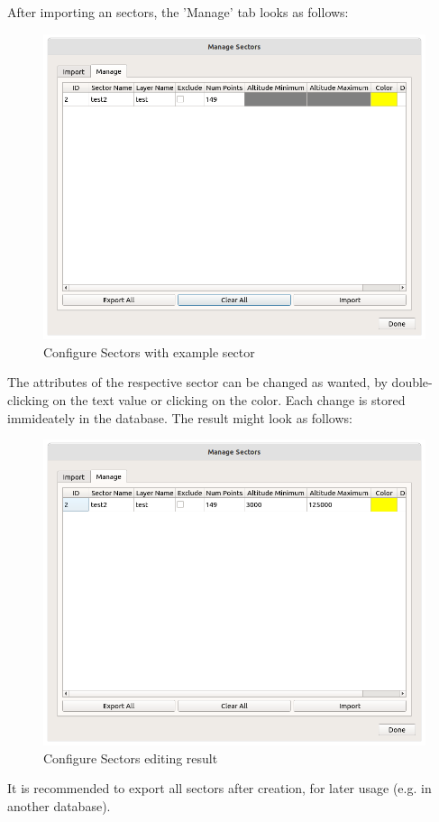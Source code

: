 After importing an sectors, the 'Manage' tab looks as follows:

\begin{figure}[H]
    \includegraphics[width=15cm]{figures/configure_sectors_manage2.png}
  \caption{Configure Sectors with example sector}
\end{figure}

The attributes of the respective sector can be changed as wanted, by double-clicking on the text value or clicking on the color. Each change is stored immideately in the database. The result might look as follows:\\

\begin{figure}[H]
    \includegraphics[width=15cm]{figures/configure_sectors_done.png}
  \caption{Configure Sectors editing result}
\end{figure}

It is recommended to export all sectors after creation, for later usage (e.g. in another database).
